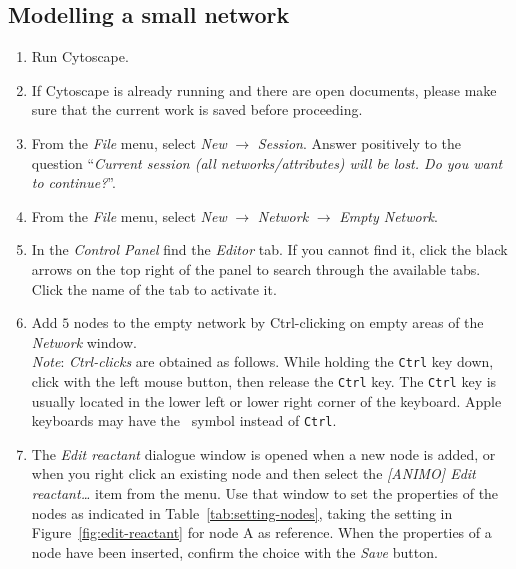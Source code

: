 \subsection{Modelling a small network}\label{sec:modeling-network-example}
\begin{enumerate}
\item Run Cytoscape.
\item If Cytoscape is already running and there are open documents, please make sure that the current work is saved before proceeding.
\item From the \emph{File} menu, select \emph{New} $\rightarrow$ \emph{Session}. Answer positively to the question
``\emph{Current session (all networks/attributes) will be lost. Do you want to continue?}''.
\item From the \emph{File} menu, select \emph{New} $\rightarrow$ \emph{Network} $\rightarrow$ \emph{Empty Network}.
\item In the \emph{Control Panel} find the \emph{Editor} tab. If you cannot find it,
click the black arrows on the top right of the panel to search through the available tabs. Click the name of the tab to activate it.
\item\label{step:add-nodes} Add $5$ nodes to the empty network by Ctrl-clicking
on empty areas of the \emph{Network} window.\\
\emph{Note}: \emph{Ctrl-clicks} are obtained as follows. While
holding the {\tt Ctrl} key down, click with the left mouse button, then release the {\tt Ctrl} key.
The {\tt Ctrl} key is usually located in the lower left or lower right corner of the keyboard. Apple keyboards
may have the \maccmd\ symbol instead of {\tt Ctrl}.
\item The \emph{Edit reactant} dialogue window is opened when a new node is added,
or when you right click an existing node and then select the \emph{[ANIMO] Edit reactant\dots}
item from the menu. Use that window to set the properties of the nodes as indicated in Table~\ref{tab:setting-nodes},
taking the setting in Figure~\ref{fig:edit-reactant} for node A as reference. When
the properties of a node have been inserted, confirm the choice with the \emph{Save} button.
\setcounter{miocounterperenumerate}{\value{enumi}}
\end{enumerate}\vspace{-2ex}


